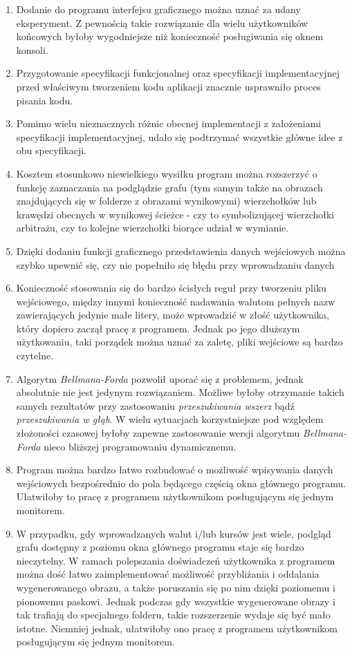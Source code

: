 \documentclass[a4paper,12pt]{article}
\begin{document}
\begin{enumerate}

\item Dodanie do programu interfejsu graficznego można uznać za udany eksperyment. Z pewnością takie rozwiązanie dla wielu użytkowników końcowych byłoby wygodniejsze niż konieczność posługiwania się oknem konsoli.
\item Przygotowanie specyfikacji funkcjonalnej oraz specyfikacji implementacyjnej przed właściwym tworzeniem kodu aplikacji znacznie usprawniło proces pisania kodu.
\item Pomimo wielu nieznacznych różnic obecnej implementacji z założeniami specyfikacji implementacyjnej, udało się podtrzymać wszystkie główne idee z obu specyfikacji. 
\item Kosztem stosunkowo niewielkiego wysiłku program można rozszerzyć o funkcję zaznaczania na podglądzie grafu (tym samym także na obrazach znajdujących się w folderze z obrazami wynikowymi) wierzchołków lub krawędzi obecnych w wynikowej ścieżce - czy to symbolizującej wierzchołki arbitrażu, czy to kolejne wierzchołki biorące udział w wymianie.
\item Dzięki dodaniu funkcji graficznego przedstawienia danych wejściowych można szybko upewnić się, czy nie popełniło się błędu przy wprowadzaniu danych
\item Konieczność stosowania się do bardzo ścisłych reguł przy tworzeniu pliku wejściowego, między innymi konieczność nadawania walutom pełnych nazw zawierających jedynie małe litery, może wprowadzić w złość użytkownika, który dopiero zaczął pracę z programem. Jednak po jego dłuższym użytkowaniu, taki porządek można uznać za zaletę, pliki wejściowe są bardzo czytelne.
\item Algorytm \textit{Bellmana-Forda} pozwolił uporać się z problemem, jednak absolutnie nie jest jedynym rozwiązaniem. Możliwe byłoby otrzymanie takich samych rezultatów przy zastosowaniu \textit{przeszukiwania wszerz} bądź \textit{przeszukiwania w głąb}. W wielu sytuacjach korzystniejsze pod względem złożoności czasowej byłoby zapewne zastosowanie wersji algorytmu \textit{Bellmana-Forda} nieco bliższej programowaniu dynamicznemu.
\item Program można bardzo łatwo rozbudować o możliwość wpisywania danych wejściowych bezpośrednio do pola będącego częścią okna głównego programu. Ułatwiłoby to pracę z programem użytkownikom posługującym się jednym monitorem.
\item W przypadku, gdy wprowadzanych walut i/lub kursów jest wiele, podgląd grafu dostępny z poziomu okna głównego programu staje się bardzo nieczytelny. W ramach polepszania doświadczeń użytkownika z programem można dość łatwo zaimplementować możliwość przybliżania i oddalania wygenerowanego obrazu, a także poruszania się po nim dzięki poziomemu i pionowemu paskowi. Jednak podczas gdy wszystkie wygenerowane obrazy i tak trafiają do specjalnego folderu, takie rozszerzenie wydaje się być mało istotne. Niemniej jednak, ułatwiłoby ono pracę z programem użytkownikom posługującym się jednym monitorem.

\end{enumerate}
\end{document}
